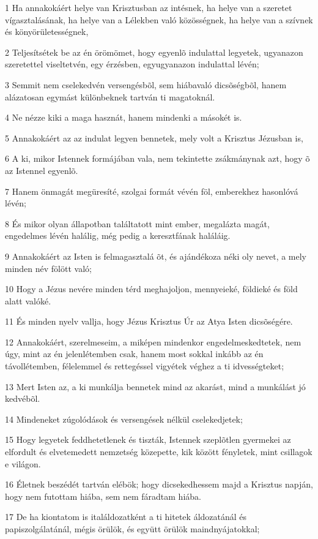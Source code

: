 \par 1 Ha annakokáért helye van Krisztusban az intésnek, ha helye van a szeretet vígasztalásának, ha helye van a Lélekben való közösségnek, ha helye van a szívnek és könyörületességnek,
\par 2 Teljesítsétek be az én örömömet, hogy egyenlõ indulattal legyetek, ugyanazon szeretettel viseltetvén, egy érzésben, egyugyanazon indulattal lévén;
\par 3 Semmit nem cselekedvén versengésbõl, sem hiábavaló dicsõségbõl, hanem alázatosan egymást különbeknek tartván ti magatoknál.
\par 4 Ne nézze kiki a maga hasznát, hanem mindenki a másokét is.
\par 5 Annakokáért az az indulat legyen bennetek, mely volt a Krisztus Jézusban is,
\par 6 A ki, mikor Istennek formájában vala, nem tekintette zsákmánynak azt, hogy õ az Istennel egyenlõ.
\par 7 Hanem önmagát megüresíté, szolgai formát vévén föl, emberekhez hasonlóvá lévén;
\par 8 És mikor olyan állapotban találtatott mint ember, megalázta magát, engedelmes lévén halálig, még pedig a keresztfának haláláig.
\par 9 Annakokáért az Isten is felmagasztalá õt, és ajándékoza néki oly nevet, a mely minden név fölött való;
\par 10 Hogy a Jézus nevére minden térd meghajoljon, mennyeieké, földieké és föld alatt valóké.
\par 11 És minden nyelv vallja, hogy Jézus Krisztus Úr az Atya Isten dicsõségére.
\par 12 Annakokáért, szerelmeseim, a miképen mindenkor engedelmeskedtetek, nem úgy, mint az én jelenlétemben csak, hanem most sokkal inkább az én távollétemben, félelemmel és rettegéssel vigyétek véghez a ti idvességteket;
\par 13 Mert Isten az, a ki munkálja bennetek mind az akarást, mind a munkálást jó kedvébõl.
\par 14 Mindeneket zúgolódások és versengések nélkül cselekedjetek;
\par 15 Hogy legyetek feddhetetlenek és tiszták, Istennek szeplõtlen gyermekei az elfordult és elvetemedett nemzetség közepette, kik között fényletek, mint csillagok e világon.
\par 16 Életnek beszédét tartván elébök; hogy dicsekedhessem majd a Krisztus napján, hogy nem futottam hiába, sem nem fáradtam hiába.
\par 17 De ha kiontatom is italáldozatként a ti hitetek áldozatánál és papiszolgálatánál, mégis örülök, és együtt örülök maindnyájatokkal;
